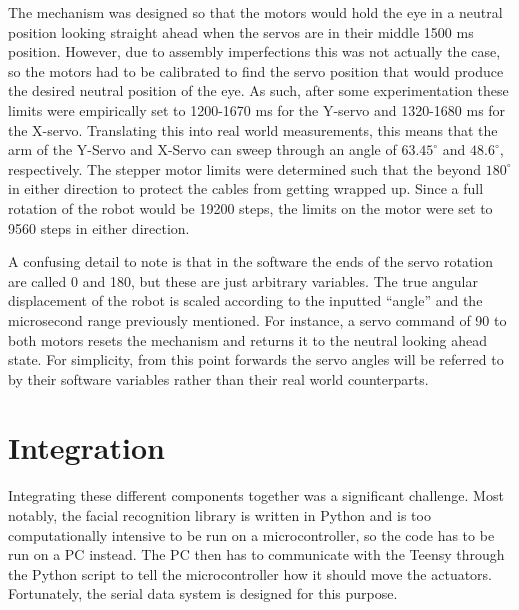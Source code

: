 The mechanism was designed so that the motors would hold the eye in a neutral position looking straight ahead when the servos are in their middle 1500 ms position. However, due to assembly imperfections this was not actually the case, so the motors had to be calibrated to find the servo position that would produce the desired neutral position of the eye. As such, after some experimentation these limits were empirically set to 1200-1670 ms for the Y-servo and 1320-1680 ms for the X-servo. Translating this into real world measurements, this means that the arm of the Y-Servo and X-Servo can sweep through an angle of $63.45^\circ$ and $48.6^\circ$, respectively. The stepper motor limits were determined such that the beyond $180^\circ$ in either direction to protect the cables from getting wrapped up. Since a full rotation of the robot would be 19200 steps, the limits on the motor were set to 9560 steps in either direction.

A confusing detail to note is that in the software the ends of the servo rotation are called 0 and 180, but these are just arbitrary variables. The true angular displacement of the robot is scaled according to the inputted ``angle'' and the microsecond range previously mentioned. For instance, a servo command of 90 to both motors resets the mechanism and returns it to the neutral looking ahead state. For simplicity, from this point forwards the servo angles will be referred to by their software variables rather than their real world counterparts.

\section{Integration}
Integrating these different components together was a significant challenge. Most notably, the facial recognition library is written in Python and is too computationally intensive to be run on a microcontroller, so the code has to be run on a PC instead. The PC then has to communicate with the Teensy through the Python script to tell the microcontroller how it should move the actuators. Fortunately, the serial data system is designed for this purpose.

